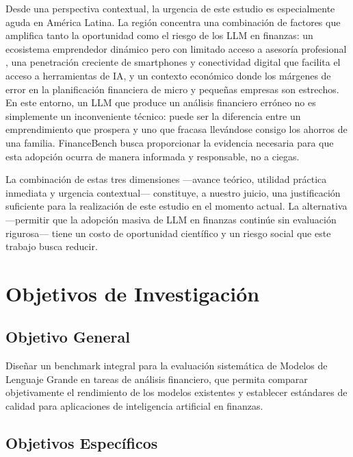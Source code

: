 \documentclass[12pt,a4paper]{article}
\begin{document}
Desde una perspectiva contextual, la urgencia de este estudio es especialmente aguda en América Latina. La región concentra una combinación de factores que amplifica tanto la oportunidad como el riesgo de los LLM en finanzas: un ecosistema emprendedor dinámico pero con limitado acceso a asesoría profesional \citep{Estefan2023}, una penetración creciente de smartphones y conectividad digital que facilita el acceso a herramientas de IA, y un contexto económico donde los márgenes de error en la planificación financiera de micro y pequeñas empresas son estrechos. En este entorno, un LLM que produce un análisis financiero erróneo no es simplemente un inconveniente técnico: puede ser la diferencia entre un emprendimiento que prospera y uno que fracasa llevándose consigo los ahorros de una familia. FinanceBench busca proporcionar la evidencia necesaria para que esta adopción ocurra de manera informada y responsable, no a ciegas.

La combinación de estas tres dimensiones ---avance teórico, utilidad práctica inmediata y urgencia contextual--- constituye, a nuestro juicio, una justificación suficiente para la realización de este estudio en el momento actual. La alternativa ---permitir que la adopción masiva de LLM en finanzas continúe sin evaluación rigurosa--- tiene un costo de oportunidad científico y un riesgo social que este trabajo busca reducir.

\section{Objetivos de Investigación}\label{sec:objetivos}

\subsection*{Objetivo General}

Diseñar un benchmark integral para la evaluación sistemática de Modelos de Lenguaje Grande en tareas de análisis financiero, que permita comparar objetivamente el rendimiento de los modelos existentes y establecer estándares de calidad para aplicaciones de inteligencia artificial en finanzas.

\subsection*{Objetivos Específicos}
\end{document}
